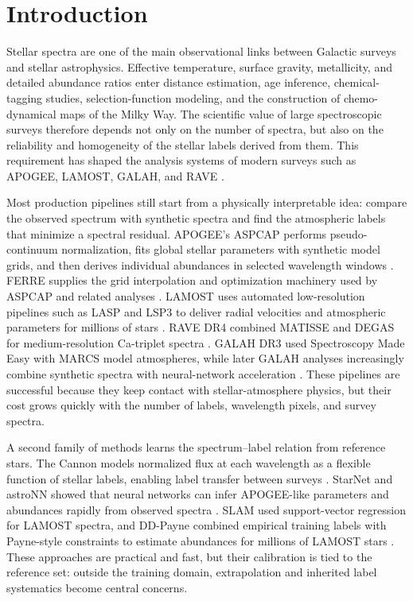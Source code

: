 \documentclass[universe,article,submit,pdftex,moreauthors]{Definitions/mdpi}
\begin{document}
\section{Introduction}

Stellar spectra are one of the main observational links between Galactic
surveys and stellar astrophysics. Effective temperature, surface gravity,
metallicity, and detailed abundance ratios enter distance estimation, age
inference, chemical-tagging studies, selection-function modeling, and the
construction of chemo-dynamical maps of the Milky Way. The scientific value of
large spectroscopic surveys therefore depends not only on the number of spectra,
but also on the reliability and homogeneity of the stellar labels derived from
them. This requirement has shaped the analysis systems of modern surveys such
as APOGEE, LAMOST, GALAH, and RAVE
\cite{majewski2017apogee,abdurrouf2022sdssdr17,luo2015lamostdr1,buder2021galahdr3,kordopatis2013rave}.

Most production pipelines still start from a physically interpretable idea:
compare the observed spectrum with synthetic spectra and find the atmospheric
labels that minimize a spectral residual. APOGEE's ASPCAP performs
pseudo-continuum normalization, fits global stellar parameters with synthetic
model grids, and then derives individual abundances in selected wavelength
windows \cite{garciaperez2016aspcap}. FERRE supplies the grid interpolation and
optimization machinery used by ASPCAP and related analyses
\cite{allendeprieto2015ferre}. LAMOST uses automated low-resolution pipelines
such as LASP and LSP3 to deliver radial velocities and atmospheric parameters
for millions of stars \cite{wu2014lasp,luo2015lamostdr1,xiang2015lsp3}. RAVE
DR4 combined MATISSE and DEGAS for medium-resolution Ca-triplet spectra
\cite{kordopatis2013rave}. GALAH DR3 used Spectroscopy Made Easy with MARCS
model atmospheres, while later GALAH analyses increasingly combine synthetic
spectra with neural-network acceleration \cite{buder2021galahdr3}. These
pipelines are successful because they keep contact with stellar-atmosphere
physics, but their cost grows quickly with the number of labels, wavelength
pixels, and survey spectra.

A second family of methods learns the spectrum--label relation from reference
stars. The Cannon models normalized flux at each wavelength as a flexible
function of stellar labels, enabling label transfer between surveys
\cite{ness2015cannon,ho2017cannon2}. StarNet and astroNN showed that neural
networks can infer APOGEE-like parameters and abundances rapidly from observed
spectra \cite{fabbro2018starnet,leung2019astronn}. SLAM used support-vector
regression for LAMOST spectra, and DD-Payne combined empirical training labels
with Payne-style constraints to estimate abundances for millions of LAMOST
stars \cite{zhang2020slam,xiang2019ddpayne}. These approaches are practical and
fast, but their calibration is tied to the reference set: outside the training
domain, extrapolation and inherited label systematics become central concerns.
\end{document}
